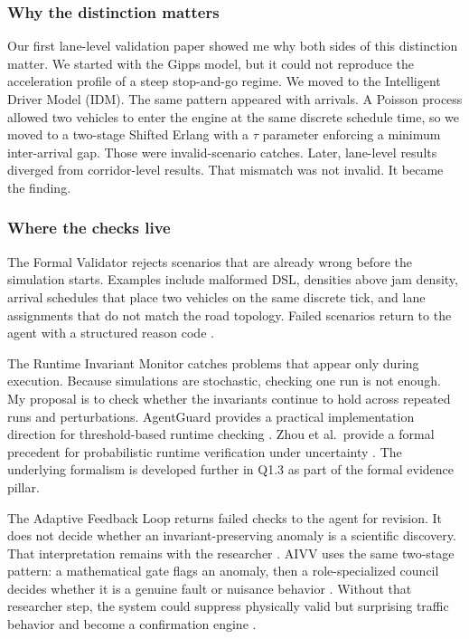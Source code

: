 \begin{bibunit}[plainnat]
\subsubsection{Why the distinction matters}

Our first lane-level validation paper showed me why both sides of this
distinction matter. We started with the Gipps model, but it could not reproduce
the acceleration profile of a steep stop-and-go regime. We moved to the
Intelligent Driver Model (IDM). The same pattern appeared with arrivals. A
Poisson process allowed two vehicles to enter the engine at the same discrete
schedule time, so we moved to a two-stage Shifted Erlang with a $\tau$
parameter enforcing a minimum inter-arrival gap. Those were invalid-scenario
catches. Later, lane-level results diverged from corridor-level results. That
mismatch was not invalid. It became the finding.

\subsubsection{Where the checks live}

The Formal Validator rejects scenarios that are already wrong before the
simulation starts. Examples include malformed DSL, densities above jam
density, arrival schedules that place two vehicles on the same discrete tick,
and lane assignments that do not match the road topology. Failed scenarios
return to the agent with a structured reason code
\citep{balci1997verification,yan2025guiding}.

The Runtime Invariant Monitor catches problems that appear only during
execution. Because simulations are stochastic, checking one run is not enough.
My proposal is to check whether the invariants continue to hold across repeated
runs and perturbations. AgentGuard provides a practical implementation
direction for threshold-based runtime checking
\citep{koohestani2025agentguard}. Zhou et al.\ provide a formal precedent for
probabilistic runtime verification under uncertainty
\citep{zhou2022runtime}. The underlying formalism is developed further in Q1.3
as part of the formal evidence pillar.

The Adaptive Feedback Loop returns failed checks to the agent for revision. It
does not decide whether an invariant-preserving anomaly is a scientific
discovery. That interpretation remains with the researcher
\citep{zanzotto2019human}. AIVV uses the same two-stage pattern: a mathematical
gate flags an anomaly, then a role-specialized council decides whether it is a
genuine fault or nuisance behavior \citep{kwon2026aivv}. Without that
researcher step, the system could suppress physically valid but surprising
traffic behavior and become a confirmation engine
\citep{treiber2013book,sugiyama2008traffic}.


\end{bibunit}
